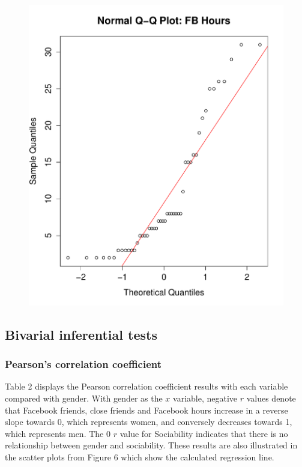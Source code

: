 \begin{figure}[H]
\includegraphics[scale=0.35]{./img/qqplot_fbhours.pdf}
\end{figure}

\subsection{Bivarial inferential tests}

\subsubsection{Pearson's correlation coefficient}

Table 2 displays the Pearson correlation coefficient results with each variable compared with gender. With gender as the $x$ variable, negative $r$ values denote that Facebook friends, close friends and Facebook hours increase in a reverse slope towards 0, which represents women, and conversely decreases towards 1, which represents men. The 0 $r$ value for Sociability indicates that there is no relationship between gender and sociability. These results are also illustrated in the scatter plots from Figure 6 which show the calculated regression line.

